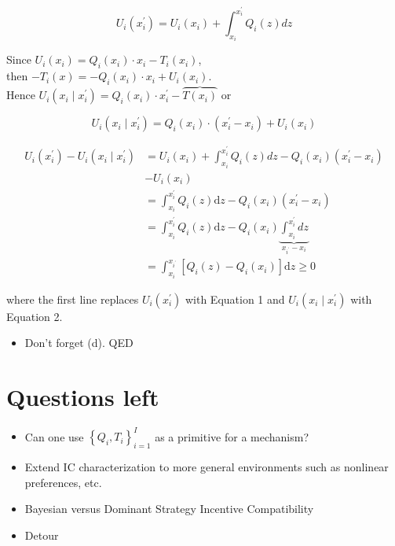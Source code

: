 \documentclass[10pt]{article}
\begin{document}
\begin{equation*}
U_{i}\left(x_{i}^{\prime}\right)=U_{i}\left(x_{i}\right)+\int_{x_{i}}^{x_{i}^{\prime}} Q_{i}(z) d z \tag{1}
\end{equation*}


Since $U_{i}\left(x_{i}\right)=Q_{i}\left(x_{i}\right) \cdot x_{i}-T_{i}\left(x_{i}\right)$,\\
then $-T_{i}(x)=-Q_{i}\left(x_{i}\right) \cdot x_{i}+U_{i}\left(x_{i}\right)$.\\
Hence $U_{i}\left(x_{i} \mid x_{i}^{\prime}\right)=Q_{i}\left(x_{i}\right) \cdot x_{i}^{\prime}-\overbrace{T\left(x_{i}\right)}$ or


\begin{equation*}
U_{i}\left(x_{i} \mid x_{i}^{\prime}\right)=Q_{i}\left(x_{i}\right) \cdot\left(x_{i}^{\prime}-x_{i}\right)+U_{i}\left(x_{i}\right) \tag{2}
\end{equation*}


$$
\begin{aligned}
U_{i}\left(x_{i}^{\prime}\right)-U_{i}\left(x_{i} \mid x_{i}^{\prime}\right) & =U_{i}\left(x_{i}\right)+\int_{x_{i}}^{x_{i}^{\prime}} Q_{i}(z) d z-Q_{i}\left(x_{i}\right)\left(x_{i}^{\prime}-x_{i}\right) \\
& -U_{i}\left(x_{i}\right) \\
& =\int_{x_{i}}^{x_{i}^{\prime}} Q_{i}(z) \mathrm{d} z-Q_{i}\left(x_{i}\right)\left(x_{i}^{\prime}-x_{i}\right) \\
& =\int_{x_{i}}^{x_{i}^{\prime}} Q_{i}(z) \mathrm{d} z-Q_{i}\left(x_{i}\right) \underbrace{\int_{x_{i}}^{x_{i}^{\prime}} d z}_{x_{i^{\prime}}-x_{i}} \\
& =\int_{x_{i}}^{x_{i^{\prime}}}\left[Q_{i}(z)-Q_{i}\left(x_{i}\right)\right] \mathrm{d} z \geq 0
\end{aligned}
$$

where the first line replaces $U_{i}\left(x_{i}^{\prime}\right)$ with Equation 1 and $U_{i}\left(x_{i} \mid x_{i}^{\prime}\right)$ with Equation 2.

\begin{itemize}
  \item Don't forget (d). QED
\end{itemize}

\section*{Questions left}
\begin{itemize}
  \item Can one use $\left\{Q_{i}, T_{i}\right\}_{i=1}^{I}$ as a primitive for a mechanism?
  \item Extend IC characterization to more general environments such as nonlinear preferences, etc.
  \item Bayesian versus Dominant Strategy Incentive Compatibility
  \item Detour
\end{itemize}
\end{document}
